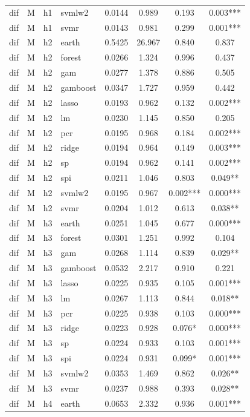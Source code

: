\begin{ThreePartTable}
\begin{longtable}[t]{llclcccc}
dif & M & h1 & svmlw2 & 0.0144 & 0.989 & 0.193 & 0.003***\\
dif & M & h1 & svmr & 0.0143 & 0.981 & 0.299 & 0.001***\\
\addlinespace
dif & M & h2 & earth & 0.5425 & 26.967 & 0.840 & 0.837\\
dif & M & h2 & forest & 0.0266 & 1.324 & 0.996 & 0.437\\
dif & M & h2 & gam & 0.0277 & 1.378 & 0.886 & 0.505\\
dif & M & h2 & gamboost & 0.0347 & 1.727 & 0.959 & 0.442\\
dif & M & h2 & lasso & 0.0193 & 0.962 & 0.132 & 0.002***\\
dif & M & h2 & lm & 0.0230 & 1.145 & 0.850 & 0.205\\
dif & M & h2 & pcr & 0.0195 & 0.968 & 0.184 & 0.002***\\
dif & M & h2 & ridge & 0.0194 & 0.964 & 0.149 & 0.003***\\
dif & M & h2 & sp & 0.0194 & 0.962 & 0.141 & 0.002***\\
dif & M & h2 & spi & 0.0211 & 1.046 & 0.803 & 0.049**\\
dif & M & h2 & svmlw2 & 0.0195 & 0.967 & 0.002*** & 0.000***\\
dif & M & h2 & svmr & 0.0204 & 1.012 & 0.613 & 0.038**\\
\addlinespace
dif & M & h3 & earth & 0.0251 & 1.045 & 0.677 & 0.000***\\
dif & M & h3 & forest & 0.0301 & 1.251 & 0.992 & 0.104\\
dif & M & h3 & gam & 0.0268 & 1.114 & 0.839 & 0.029**\\
dif & M & h3 & gamboost & 0.0532 & 2.217 & 0.910 & 0.221\\
dif & M & h3 & lasso & 0.0225 & 0.935 & 0.105 & 0.001***\\
dif & M & h3 & lm & 0.0267 & 1.113 & 0.844 & 0.018**\\
dif & M & h3 & pcr & 0.0225 & 0.938 & 0.103 & 0.000***\\
dif & M & h3 & ridge & 0.0223 & 0.928 & 0.076* & 0.000***\\
dif & M & h3 & sp & 0.0224 & 0.933 & 0.103 & 0.001***\\
dif & M & h3 & spi & 0.0224 & 0.931 & 0.099* & 0.001***\\
dif & M & h3 & svmlw2 & 0.0353 & 1.469 & 0.862 & 0.026**\\
dif & M & h3 & svmr & 0.0237 & 0.988 & 0.393 & 0.028**\\
\addlinespace
dif & M & h4 & earth & 0.0653 & 2.332 & 0.936 & 0.001***\\

\end{longtable}
\end{ThreePartTable}
